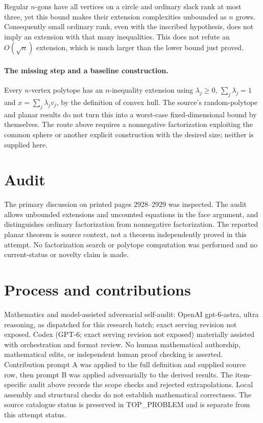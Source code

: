 \documentclass[11pt]{article}
\begin{document}
Regular $n$-gons have all vertices on a circle and ordinary
slack rank at most three, yet this bound makes their extension
complexities unbounded as $n$ grows. Consequently small ordinary
rank, even with the inscribed hypothesis, does not imply an
extension with that many inequalities. This does not refute an
$O(\sqrt n)$ extension, which is much larger than the lower
bound just proved.

\paragraph{The missing step and a baseline construction.}
Every $n$-vertex polytope has an $n$-inequality extension using
$\lambda_j\ge0$, $\sum_j\lambda_j=1$ and
$x=\sum_j\lambda_jv_j$, by the definition of convex hull.
The source's random-polytope and planar results do not turn this
into a worst-case fixed-dimensional bound by themselves. The route
above requires a nonnegative factorization exploiting the common
sphere or another explicit construction with the desired size;
neither is supplied here.

\section{Audit}
The primary discussion on printed pages 2928--2929 was inspected.
The audit allows unbounded extensions and uncounted equations in
the face argument, and distinguishes ordinary factorization from
nonnegative factorization. The reported planar theorem is source
context, not a theorem independently proved in this attempt.
No factorization search or polytope computation was performed and
no current-status or novelty claim is made.

\section{Process and contributions}
Mathematics and model-assisted adversarial self-audit: OpenAI gpt-6-astra, ultra reasoning, as dispatched for this research batch; exact serving revision not exposed. Codex (GPT-6; exact serving revision not exposed) materially assisted with orchestration and format review. No human mathematical authorship, mathematical edits, or independent human proof checking is asserted.
Contribution prompt A was applied to the full definition and supplied source row, then prompt B was applied adversarially to the derived results. The item-specific audit above records the scope checks and rejected extrapolations. Local assembly and structural checks do not establish mathematical correctness. The source catalogue status is preserved in TOP\_PROBLEM and is separate from this attempt status.
\end{document}
